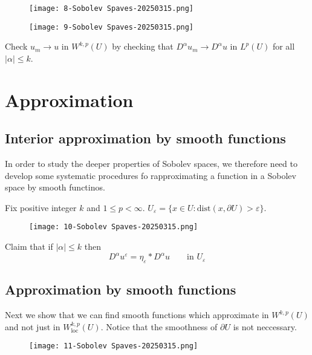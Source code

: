 \begin{figure}[H]
\centering
\texttt{[image: 8-Sobolev Spaves-20250315.png]}
\label{}
\end{figure}

\begin{figure}[H]
\centering
\texttt{[image: 9-Sobolev Spaves-20250315.png]}
\label{}
\end{figure}

Check $u_m\to u$ in $W^{k,p}(U)$ by checking that $D^{\alpha}u_m\to D^{\alpha}u$ in $L^{p}(U)$ for all $\lvert \alpha \rvert\leq k$.

\section{Approximation}

\subsection{Interior approximation by smooth functions}

In order to study the deeper properties of Sobolev spaces, we therefore need to develop some systematic procedures fo rapproximating a function in a Sobolev space by smooth functinos.

Fix positive integer $k$ and $1\leq p<\infty$. $U_{\varepsilon}=\{ x\in U:\mathrm{dist}(x,\partial U)>\varepsilon \}$.

\begin{figure}[H]
\centering
\texttt{[image: 10-Sobolev Spaves-20250315.png]}
\label{}
\end{figure}

Claim that if $\lvert \alpha \rvert\leq k$ then
\[
D^{\alpha}u^{\varepsilon}=\eta_{\varepsilon}*D^{\alpha}u\qquad \text{in }U_{\varepsilon}
\]
\subsection{Approximation by smooth functions}

Next we show that we can find smooth functions which approximate in $W^{k,p}(U)$ and not just in $W^{k,p}_{\text{loc}}(U)$. Notice that the smoothness of $\partial U$ is not neccessary.

\begin{figure}[H]
\centering
\texttt{[image: 11-Sobolev Spaves-20250315.png]}
\label{}
\end{figure}


